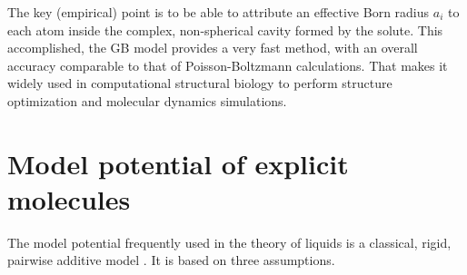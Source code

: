 The key (empirical) point is to be able to attribute an effective
Born radius $a_{i}$ to each atom inside the complex, non-spherical
cavity formed by the solute. This accomplished, the GB model provides
a very fast method, with an overall accuracy comparable to that of
Poisson-Boltzmann calculations. That makes it widely used in computational
structural biology to perform structure optimization and molecular
dynamics simulations.

\section{Model potential of explicit molecules}

The model potential frequently used in the theory of liquids is a
classical, rigid, pairwise additive model \citep{Hensen-McDonald,Gray-Gubbins}.
It is based on three assumptions. 
